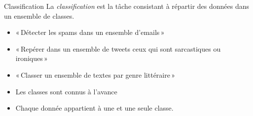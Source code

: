 \documentclass[../allslides.tex]{subfiles}
\begin{document}
\begin{frame}[fragile=singleslide]{Classification}
    La \emph{classification} est la tâche consistant à \alert{répartir} des données dans un ensemble de classes.
    \begin{itemize}
        \item « Détecter les \textcolor{highlight8}{spams} dans un ensemble d'\textcolor{highlight4}{emails} »
        \item « Repérer dans un ensemble de \textcolor{highlight4}{tweets} ceux qui sont \textcolor{highlight8}{sarcastiques} ou \textcolor{highlight8}{ironiques} »
        \item « Classer un ensemble de \textcolor{highlight4}{textes} par \textcolor{highlight8}{genre littéraire} »
    \end{itemize}
    \begin{figure}
        \tikzset{external/export=true}
    \end{figure}
    \begin{itemize}
        \item Les \textcolor{highlight8}{classes} sont connus à l'avance
        \item Chaque \textcolor{highlight4}{donnée} appartient à une et une seule \textcolor{highlight1}{classe}.
    \end{itemize}
\end{frame}
\end{document}
